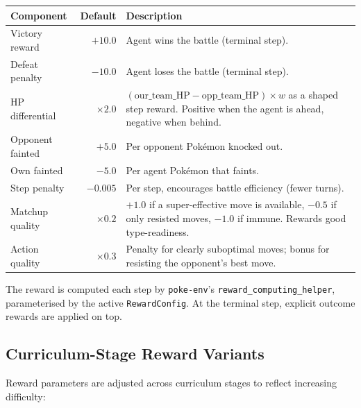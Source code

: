 \begin{center}
\small
\begin{tabularx}{\textwidth}{l r X}
  \toprule
  \textbf{Component} & \textbf{Default} & \textbf{Description} \\
  \midrule
  Victory reward     & $+10.0$  & Agent wins the battle (terminal step). \\
  Defeat penalty     & $-10.0$  & Agent loses the battle (terminal step). \\
  HP differential    & $\times 2.0$ &
    $(\text{our\_team\_HP} - \text{opp\_team\_HP}) \times w$ as a shaped
    step reward.  Positive when the agent is ahead, negative when behind. \\
  Opponent fainted   & $+5.0$   & Per opponent Pok\'{e}mon knocked out. \\
  Own fainted        & $-5.0$   & Per agent Pok\'{e}mon that faints. \\
  Step penalty       & $-0.005$ & Per step, encourages battle efficiency
                                    (fewer turns). \\
  Matchup quality    & $\times 0.2$ &
    $+1.0$ if a super-effective move is available, $-0.5$ if only resisted
    moves, $-1.0$ if immune.  Rewards good type-readiness. \\
  Action quality     & $\times 0.3$ &
    Penalty for clearly suboptimal moves; bonus for resisting the opponent's
    best move. \\
  \bottomrule
\end{tabularx}
\end{center}

The reward is computed each step by \texttt{poke-env}'s
\texttt{reward\_computing\_helper}, parameterised by the active
\texttt{RewardConfig}.  At the terminal step, explicit outcome rewards are
applied on top.

\subsection{Curriculum-Stage Reward Variants}

Reward parameters are adjusted across curriculum stages to reflect increasing
difficulty:

